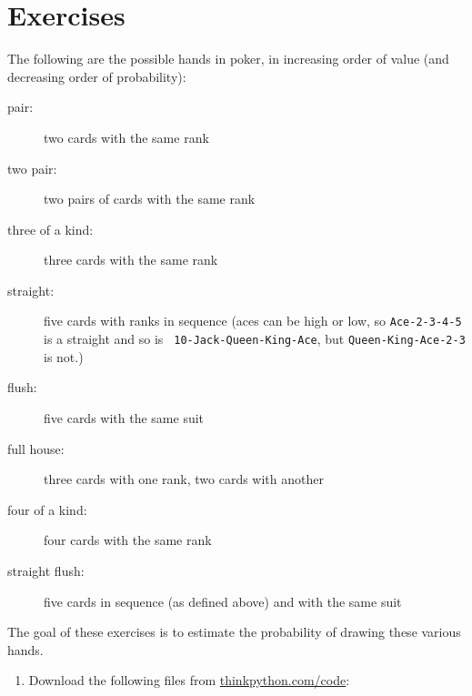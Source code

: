 \documentclass[10pt]{book}
\begin{document}
\section{Exercises}

\begin{ex}


The following are the possible hands in poker, in increasing order
of value (and decreasing order of probability):

\begin{description}

\item[pair:] two cards with the same rank
\vspace{-0.05in}

\item[two pair:] two pairs of cards with the same rank
\vspace{-0.05in}

\item[three of a kind:] three cards with the same rank
\vspace{-0.05in}

\item[straight:] five cards with ranks in sequence (aces can
be high or low, so {\tt Ace-2-3-4-5} is a straight and so is {\tt
10-Jack-Queen-King-Ace}, but {\tt Queen-King-Ace-2-3} is not.)
\vspace{-0.05in}

\item[flush:] five cards with the same suit
\vspace{-0.05in}

\item[full house:] three cards with one rank, two cards with another
\vspace{-0.05in}

\item[four of a kind:] four cards with the same rank
\vspace{-0.05in}

\item[straight flush:] five cards in sequence (as defined above) and
with the same suit
\vspace{-0.05in}

\end{description}
%
The goal of these exercises is to estimate
the probability of drawing these various hands.

\begin{enumerate}

\item Download the following files from \url{thinkpython.com/code}:


\end{enumerate}
\end{ex}
\end{document}
